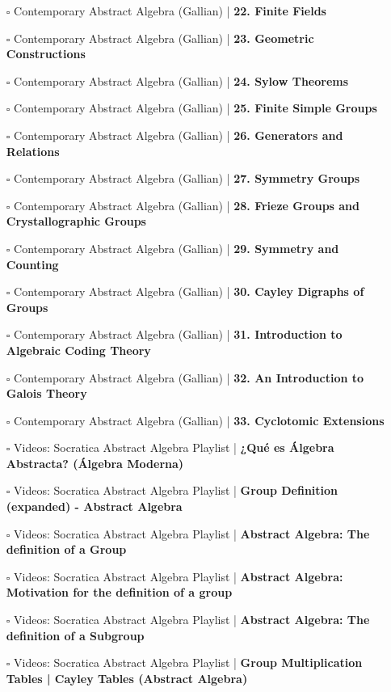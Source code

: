 \documentclass[a4, landscape, 12pt]{article}
\newcommand{\checkbox}{$\square$}%
\begin{document}
\begin{itemize}
{}
\item [\checkbox] Contemporary Abstract Algebra (Gallian)  | \textbf{22. Finite Fields
}
\item [\checkbox] Contemporary Abstract Algebra (Gallian)  | \textbf{23. Geometric Constructions
}
\item [\checkbox] Contemporary Abstract Algebra (Gallian)  | \textbf{24. Sylow Theorems
}
\item [\checkbox] Contemporary Abstract Algebra (Gallian)  | \textbf{25. Finite Simple Groups
}
\item [\checkbox] Contemporary Abstract Algebra (Gallian)  | \textbf{26. Generators and Relations
}
\item [\checkbox] Contemporary Abstract Algebra (Gallian)  | \textbf{27. Symmetry Groups
}
\item [\checkbox] Contemporary Abstract Algebra (Gallian)  | \textbf{28. Frieze Groups and Crystallographic Groups
}
\item [\checkbox] Contemporary Abstract Algebra (Gallian)  | \textbf{29. Symmetry and Counting
}
\item [\checkbox] Contemporary Abstract Algebra (Gallian)  | \textbf{30. Cayley Digraphs of Groups
}
\item [\checkbox] Contemporary Abstract Algebra (Gallian)  | \textbf{31. Introduction to Algebraic Coding Theory
}
\item [\checkbox] Contemporary Abstract Algebra (Gallian)  | \textbf{32. An Introduction to Galois Theory
}
\item [\checkbox] Contemporary Abstract Algebra (Gallian)  | \textbf{33. Cyclotomic Extensions
}
\item [\checkbox] Videos: Socratica Abstract Algebra Playlist  | \textbf{¿Qué es Álgebra Abstracta? (Álgebra Moderna)
}
\item [\checkbox] Videos: Socratica Abstract Algebra Playlist  | \textbf{Group Definition (expanded) - Abstract Algebra
}
\item [\checkbox] Videos: Socratica Abstract Algebra Playlist  | \textbf{Abstract Algebra: The definition of a Group
}
\item [\checkbox] Videos: Socratica Abstract Algebra Playlist  | \textbf{Abstract Algebra: Motivation for the definition of a group
}
\item [\checkbox] Videos: Socratica Abstract Algebra Playlist  | \textbf{Abstract Algebra: The definition of a Subgroup
}
\item [\checkbox] Videos: Socratica Abstract Algebra Playlist  | \textbf{Group Multiplication Tables | Cayley Tables (Abstract Algebra)
}
\end{itemize}
\end{document}
